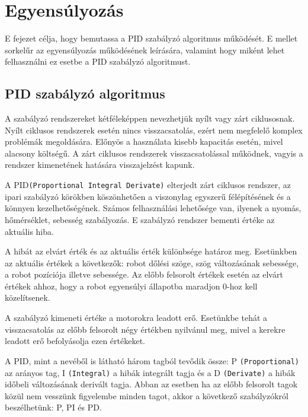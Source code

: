 \chapter{Egyensúlyozás}\label{ch:EGYENSULY}
\begin{osszefoglal}
E fejezet célja, hogy bemutassa a PID szabályzó algoritmus működését. E mellet sorkelűr az egyensúlyozás működésének leírására, valamint hogy miként lehet felhasználni ez esetbe a PID szabályzó algoritmust.
\end{osszefoglal}

\section{PID szabályzó algoritmus}\label{sec:EGYENSULY:pid}

A szabályzó rendszereket kétféleképpen nevezhetjük nyílt vagy zárt ciklusosnak.  Nyílt ciklusos rendszerek esetén nincs visszacsatolás, ezért nem megfelelő komplex problémák megoldására. Előnyös a használata kisebb kapacitás esetén, mivel alacsony költségű. A zárt ciklusos rendszerek visszacsatolással működnek, vagyis a rendszer kimenetének hatására visszajelzést kapunk.

A PID\texttt{(Proportional Integral Derivate)} elterjedt zárt ciklusos rendszer, az ipari szabályzó körökben köszönhetően a viszonylag egyszerű félépítésének és a könnyen kezelhetőségének. Számos felhasználási lehetősége van, ilyenek a nyomás, hőmérséklet, sebesség szabályozás. E szabályzó rendszer bementi értéke az aktuális hiba.

A hibát az elvárt érték és az aktuális érték különbsége határoz meg. Esetünkben az aktuális értékek a következők: robot dőlési szöge, szög változásának sebessége, a robot pozíciója illetve sebessége. Az előbb felsorolt értékek esetén az elvárt értékek ahhoz, hogy a robot egyensúlyi állapotba maradjon 0-hoz kell közelítsenek.

A szabályzó kimeneti értéke a motorokra leadott erő. Esetünkbe tehát a visszacsatolás az előbb felsorolt négy értékben nyilvánul meg, mivel a kerekre leadott erő befolyásolja ezen értékeket.

A PID, mint a nevéből is látható három tagból tevődik össze: P \texttt{(Proportional)} az arányos tag, I \texttt{(Integral)} a hibák integrált tagja és a D \texttt{(Derivate)} a hibák időbeli változásának derivált tagja. Abban az esetben ha az előbb felsorolt tagok közül nem vesszünk figyelembe minden tagot, akkor a következő szabályzókról beszélhetünk: P, PI és PD.

